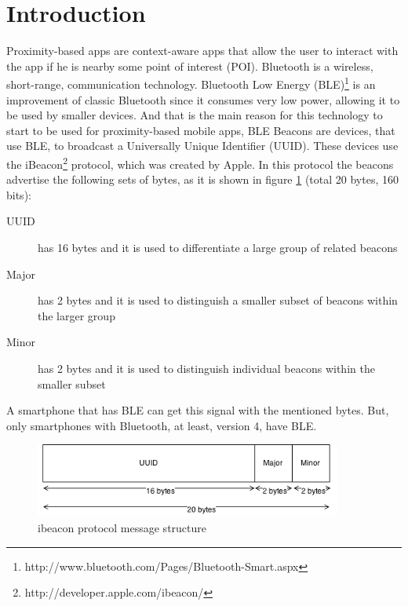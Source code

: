 
\section{Introduction}
\label{sec:introduction}
Proximity-based apps are
context-aware apps that allow the user to interact
with the app if he is nearby some point of interest (POI).
Bluetooth is a wireless, short-range, communication technology.
Bluetooth Low Energy (BLE)\footnote{http://www.bluetooth.com/Pages/Bluetooth-Smart.aspx}
is an improvement of classic Bluetooth since it consumes
very low power, allowing it to be used by smaller devices.
And that is the main reason for this technology to start to
be used for proximity-based mobile apps,
BLE Beacons are devices, that use BLE, to broadcast a
Universally Unique Identifier (UUID).
These devices use the
iBeacon\footnote{http://developer.apple.com/ibeacon/}
protocol, which was created
by Apple\texttrademark. In this protocol the beacons
advertise the following sets of bytes, as it is shown in
figure \ref{fig:ibeacon}
(total 20 bytes, 160 bits):
\begin{description}
  \item[UUID] has 16 bytes and it is used to differentiate a
  large group of related beacons
  \item[Major] has 2 bytes and it is used to distinguish a smaller
  subset of beacons within the larger group
  \item[Minor] has 2 bytes and it is used to distinguish individual
  beacons within the smaller subset
\end{description}
A smartphone that
has BLE can get this signal with the mentioned bytes.
But, only smartphones
with Bluetooth, at least, version 4, have BLE.

\begin{figure}[!ht]
  \centering
    \includegraphics[width=0.9\textwidth]{figures/ibeacon}
    \caption{ibeacon protocol message structure}
    \label{fig:ibeacon}
\end{figure}


